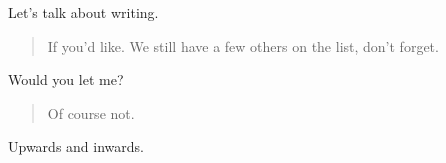 Let's talk about writing.

\begin{quote}
If you'd like. We still have a few others on the list, don't forget.
\end{quote}

Would you let me?

\begin{quote}
Of course not.
\end{quote}

Upwards and inwards.
